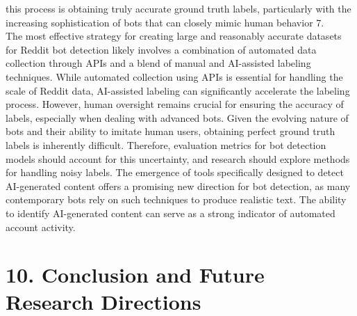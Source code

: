 \documentclass[
  12pt,
  letterpaper,
  DIV=11,
  numbers=noendperiod]{scrartcl}
\begin{document}
this process is obtaining truly accurate ground truth labels,
particularly with the increasing sophistication of bots that can closely
mimic human behavior 7.\\
The most effective strategy for creating large and reasonably accurate
datasets for Reddit bot detection likely involves a combination of
automated data collection through APIs and a blend of manual and
AI-assisted labeling techniques. While automated collection using APIs
is essential for handling the scale of Reddit data, AI-assisted labeling
can significantly accelerate the labeling process. However, human
oversight remains crucial for ensuring the accuracy of labels,
especially when dealing with advanced bots. Given the evolving nature of
bots and their ability to imitate human users, obtaining perfect ground
truth labels is inherently difficult. Therefore, evaluation metrics for
bot detection models should account for this uncertainty, and research
should explore methods for handling noisy labels. The emergence of tools
specifically designed to detect AI-generated content offers a promising
new direction for bot detection, as many contemporary bots rely on such
techniques to produce realistic text. The ability to identify
AI-generated content can serve as a strong indicator of automated
account activity.

\section{\texorpdfstring{\textbf{10. Conclusion and Future Research
Directions}}{10. Conclusion and Future Research Directions}}\label{conclusion-and-future-research-directions}
\end{document}
